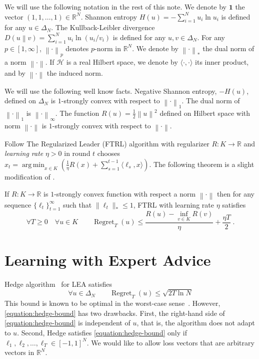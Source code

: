 \documentclass{colt2016} %
\DeclareMathOperator{\Regret}{Regret}
\newcommand{\R}{\mathbb{R}}     %
\renewcommand{\H}{\mathcal{H}}  %
\newcommand{\KL}[2]{D\left({#1}\middle\|{#2}\right)}  %
\newcommand{\norm}[1]{\left\|{#1}\right\|}
\DeclareMathOperator*{\argmin}{arg\,min}
\newcommand{\indicator}{\mathbf{1}}
\begin{document}
We will use the following notation in the rest of this note. We denote by
$\indicator$ the vector $(1,1,\dots,1) \in \R^N$. Shannon entropy $H(u) =
-\sum_{i=1}^N u_i \ln u_i$ is defined for any $u \in \Delta_N$.  The
Kullback-Leibler divergence $\KL{u}{v} = \sum_{i=1}^N u_i \ln(u_i/v_i)$ is
defined for any $u,v \in \Delta_N$. For any $p \in [1,\infty]$,
$\norm{\cdot}_p$ denotes $p$-norm in $\R^N$.  We denote by $\norm{\cdot}_*$ the
dual norm of a norm $\norm{\cdot}$.  If $\H$ is a real Hilbert space, we denote
by $\langle \cdot, \cdot \rangle$ its inner product, and by $\norm{\cdot}$ the
induced norm.

We will use the following well know facts.  Negative Shannon entropy, $-H(u)$,
defined on $\Delta_N$ is $1$-strongly convex with respect to $\norm{\cdot}_1$.
The dual norm of $\norm{\cdot}_1$ is $\norm{\cdot}_\infty$.  The function $R(u)
= \frac{1}{2}\norm{u}^2$ defined on Hilbert space with norm $\norm{\cdot}$ is
$1$-strongly convex with respect to $\norm{\cdot}$.

Follow The Regularized Leader (FTRL) algorithm with regularizer $R:K \to \R$
and \emph{learning rate} $\eta > 0$ in round $t$ chooses
$
x_t = \argmin_{x \in K} \left( \frac{1}{\eta} R(x) + \sum_{s=1}^{t-1} \langle \ell_s, x \rangle \right)
$.
The following theorem is a slight modification of \citet[Theorem 2.11]{Shalev-Shwartz-2011}.
\begin{theorem}
\label{theorem:ftrl-regret}
If $R:K \to \R$ is $1$-strongly convex function with respect a norm
$\norm{\cdot}$ then for any sequence $\{\ell_t\}_{t=1}^\infty$ such that
$\|\ell_t\|_* \le 1$, FTRL with learning rate $\eta$ satisfies
$$
\forall T \ge 0 \quad \forall u \in K \qquad \Regret_T(u) \le \frac{R(u) - \inf_{v \in K} R(v)}{\eta} + \frac{\eta T}{2} \; .
$$
\end{theorem}

\section{Learning with Expert Advice}

Hedge algorithm~\citep{Freund-Schapire-1997} for LEA satisfies
\begin{equation}
\label{equation:hedge-bound}
\forall u \in \Delta_N \qquad \Regret_T(u) \le \sqrt{2 T \ln N}
\end{equation}
This bound is known to be optimal in the worst-case sense~\cite[Section
3.7]{Cesa-Bianchi-Lugosi-2006}. However, \eqref{equation:hedge-bound} has two
drawbacks.  First, the right-hand side of \eqref{equation:hedge-bound} is
independent of $u$, that is, the algorithm does not adapt to $u$.
Second, Hedge satisfies \eqref{equation:hedge-bound} only if $\ell_1, \ell_2,
\dots, \ell_T \in [-1,1]^N$. We would like to allow loss vectors that are
arbitrary vectors in $\R^N$.
\end{document}
